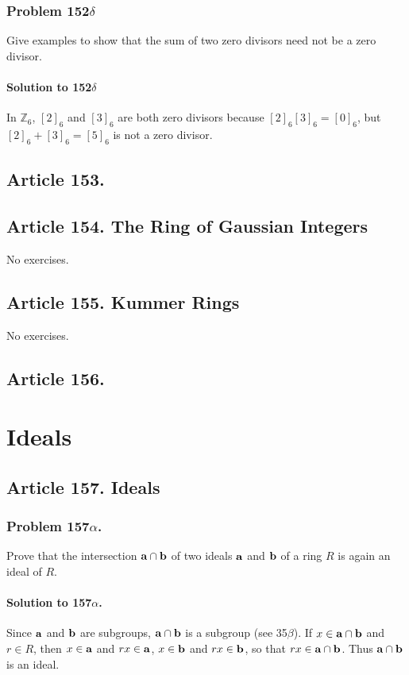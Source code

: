 \subsubsection{Problem 152$\delta$}
Give examples to show that the sum of two zero divisors need not be a zero
divisor.

\paragraph*{Solution to 152$\delta$}
In $\mathbb{Z}_6$, $[2]_6$ and $[3]_6$ are both zero divisors because
$[2]_6 [3]_6 = [0]_6$, but $[2]_6  + [3]_6 = [5]_6$ is not a zero divisor.
\subsection{Article 153.}

\subsection{Article 154. The Ring of Gaussian Integers}

No exercises.
\subsection{Article 155. Kummer Rings}

No exercises.
\subsection{Article 156.}


\section{Ideals}


\subsection{Article 157. Ideals}
\subsubsection{Problem 157$\alpha$.}
Prove that the intersection $ \mathsf{\mathbf{a}} \cap \mathsf{\mathbf{b}} $ of two ideals $\mathsf{\mathbf{a}}$
and $\mathsf{\mathbf{b}}$ of a ring $R$ is again an ideal of $R$.

\paragraph*{Solution to 157$\alpha$.}
Since $\mathsf{\mathbf{a}}$ and $\mathsf{\mathbf{b}}$ are subgroups, $\mathsf{\mathbf{a}} \cap \mathsf{\mathbf{b}}$ is a
subgroup (see 35$\beta$). If $ x \in \mathsf{\mathbf{a}} \cap \mathsf{\mathbf{b}}$ and $ r \in R $,
then $x \in \mathsf{\mathbf{a}} $ and $ rx \in \mathsf{\mathbf{a}}$, $ x \in \mathsf{\mathbf{b}}$ and $ rx \in
\mathsf{\mathbf{b}}$, so that $ rx \in \mathsf{\mathbf{a}} \cap \mathsf{\mathbf{b}}$.  Thus $ \mathsf{\mathbf{a}} \cap
\mathsf{\mathbf{b}} $ is an ideal.

